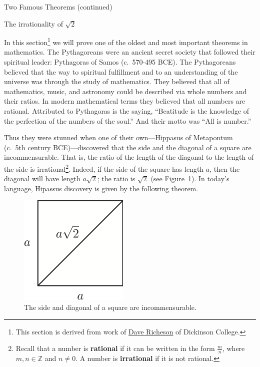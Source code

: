 \documentclass[11pt]{article}
\theoremstyle{definition}
\begin{document}
\addtocounter{section}{3}

\begin{section}{Two Famous Theorems (continued)}

\addtocounter{subsection}{1}
\addtocounter{theorem}{5}

\begin{subsection}{The irrationality of $\sqrt{2}$}

In this section\footnote{This section is derived from work of \href{http://users.dickinson.edu/~richesod/}{Dave Richeson} of Dickinson College.} we will prove one of the oldest and most important theorems in mathematics. The Pythagoreans were an ancient secret society that followed their spiritual leader: Pythagoras of Samos (c.\ 570-495 BCE). The Pythagoreans believed that the way to spiritual fulfillment and to an understanding of the universe was through the study of mathematics. They believed that all of mathematics, music, and astronomy could be described via whole numbers and their ratios. In modern mathematical terms they believed that all numbers are rational. Attributed to Pythagoras is the saying, ``Beatitude is the knowledge of the perfection of the numbers of the soul.'' And their motto was ``All is number.''

Thus they were stunned when one of their own---Hippasus of Metapontum (c.\ 5th century BCE)---discovered that the side and the diagonal of a square are incommensurable. That is, the ratio of the length of the diagonal to the length of the side is irrational\footnote{Recall that a number is \textbf{rational} if it can be written in the form $\frac{m}{n}$, where $m,n\in\mathbb{Z}$ and $n\neq 0$.  A number is \textbf{irrational} if it is not rational.}. Indeed, if the side of the square has length $a$, then the diagonal will have length $a\sqrt{2}$; the ratio is $\sqrt{2}$ (see Figure~\ref{fig:square}).  In today's language, Hipassus discovery is given by the following theorem.

\begin{figure}[ht]
\begin{center}
\includegraphics{square}
\end{center}
\vspace{-.5cm}
\caption{The side and diagonal of a square are incommensurable.}
\label{fig:square}
\end{figure}


\end{subsection}
\end{section}
\end{document}
